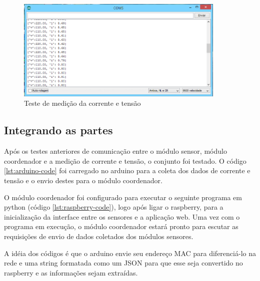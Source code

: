

\begin{figure}[H]
\centering
\includegraphics[width=10cm,keepaspectratio]{figuras/ferro-passar.png} 
\caption{\label{fig:teste-medicao-corrente-voltagem} Teste de medição da corrente e tensão}
\end{figure}

\subsection{Integrando as partes}

Após os testes anteriores de comunicação entre o módulo sensor, módulo coordenador e a medição de corrente e tensão, o conjunto foi testado. O código \ref{lst:arduino-code} foi carregado no arduino para a coleta dos dados de corrente e tensão e o envio destes para o módulo coordenador.



O módulo coordenador foi configurado para executar o seguinte programa em python (código \ref{lst:raspberry-code}), logo após ligar o raspberry, para a inicialização da interface entre os sensores e a aplicação web. Uma vez com o programa em execução, o módulo coordenador estará pronto para escutar as requisições de envio de dados coletados dos módulos sensores. 



A idéia dos códigos é que o arduino envie seu endereço MAC para diferenciá-lo na rede e uma string formatada como um JSON para que esse seja convertido no raspberry e as informações sejam extraídas.

